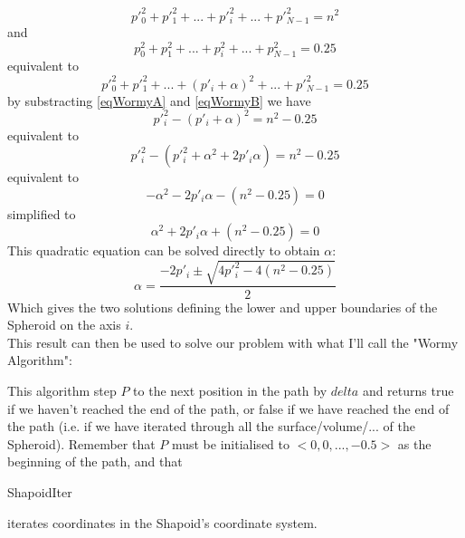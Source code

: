 \begin{equation}
\label{eqWormyA}
p'^2_0+p'^2_1+...+p'^2_i+...+p'^2_{N-1}=n^2
\end{equation}
and \\
\begin{equation}
p^2_0+p^2_1+...+p^2_i+...+p^2_{N-1}=0.25
\end{equation}
equivalent to \\
\begin{equation}
\label{eqWormyB}
p'^2_0+p'^2_1+...+(p'_i+\alpha)^2+...+p'^2_{N-1}=0.25
\end{equation}
by substracting \eqref{eqWormyA} and \eqref{eqWormyB} we have\\
\begin{equation}
p'^2_i-(p'_i+\alpha)^2=n^2-0.25
\end{equation}
equivalent to\\
\begin{equation}
p'^2_i-(p'^2_i+\alpha^2+2p'_i\alpha)=n^2-0.25
\end{equation}
equivalent to\\
\begin{equation}
-\alpha^2-2p'_i\alpha-(n^2-0.25)=0
\end{equation}
simplified to\\
\begin{equation}
\alpha^2+2p'_i\alpha+(n^2-0.25)=0
\end{equation}
This quadratic equation can be solved directly to obtain $\alpha$:\\
\begin{equation}
\alpha=\frac{-2p'_i\pm\sqrt{4p'^2_i-4(n^2-0.25)}}{2}
\end{equation}
Which gives the two solutions defining the lower and upper boundaries of the Spheroid on the axis $i$.\\

This result can then be used to solve our problem with what I'll call the "Wormy Algorithm":\\

\begin{scriptsize}
\begin{ttfamily}

\end{ttfamily}
\end{scriptsize}

This algorithm step $P$ to the next position in the path by $delta$ and returns true if we haven't reached the end of the path, or false if we have reached the end of the path (i.e. if we have iterated through all the surface/volume/... of the Spheroid). Remember that $P$ must be initialised to $<0,0,...,-0.5>$ as the beginning of the path, and that \begin{ttfamily}ShapoidIter\end{ttfamily} iterates coordinates in the Shapoid's coordinate system.\\

